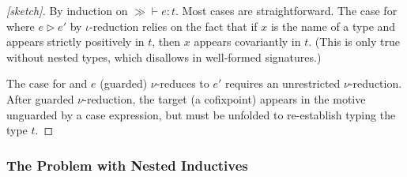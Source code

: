 \begin{proof}[{[sketch]}]
  By induction on $\gg \vdash e : t$.
  Most cases are straightforward.
  The case for  where $e \rhd e'$ by $\iota$-reduction relies on the fact that
  if $x$ is the name of a \coinductive type and appears strictly positively in $t$,
  then $x$ appears covariantly in $t$.
  (This is only true without nested \coinductive types, which \lang disallows in well-formed signatures.)

  The case for  and $e$ (guarded) $\nu$-reduces to $e'$ requires an unrestricted $\nu$-reduction.
  After guarded $\nu$-reduction, the target (a cofixpoint) appears in the motive unguarded by a case expression, but must be unfolded to re-establish typing the type $t$.
\end{proof}

\subsubsection{The Problem with Nested Inductives}

\newcommand{\nat}{\const{N}}

